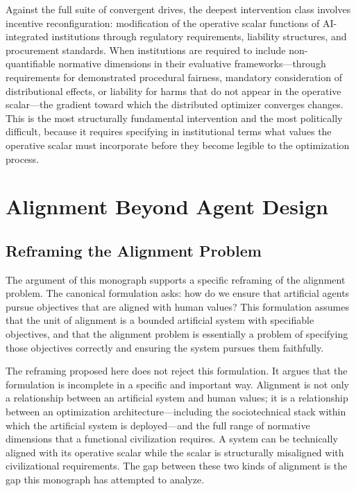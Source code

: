 \documentclass[12pt, oneside]{book}
\theoremstyle{plain}
\theoremstyle{definition}
\theoremstyle{remark}
\theoremstyle{definition}
\begin{document}
Against the full suite of convergent drives, the deepest intervention class involves
incentive reconfiguration: modification of the operative scalar functions of
AI-integrated institutions through regulatory requirements, liability structures,
and procurement standards. When institutions are required to include non-quantifiable
normative dimensions in their evaluative frameworks---through requirements for
demonstrated procedural fairness, mandatory consideration of distributional effects,
or liability for harms that do not appear in the operative scalar---the gradient
toward which the distributed optimizer converges changes. This is the most structurally
fundamental intervention and the most politically difficult, because it requires
specifying in institutional terms what values the operative scalar must incorporate
before they become legible to the optimization process.

\chapter{Alignment Beyond Agent Design}
\label{ch:beyond}

\section{Reframing the Alignment Problem}

The argument of this monograph supports a specific reframing of the alignment
problem. The canonical formulation asks: how do we ensure that artificial agents
pursue objectives that are aligned with human values? This formulation assumes that
the unit of alignment is a bounded artificial system with specifiable objectives,
and that the alignment problem is essentially a problem of specifying those objectives
correctly and ensuring the system pursues them faithfully.

The reframing proposed here does not reject this formulation. It argues that the
formulation is incomplete in a specific and important way. Alignment is not only
a relationship between an artificial system and human values; it is a relationship
between an optimization architecture---including the sociotechnical stack within
which the artificial system is deployed---and the full range of normative dimensions
that a functional civilization requires. A system can be technically aligned with
its operative scalar while the scalar is structurally misaligned with civilizational
requirements. The gap between these two kinds of alignment is the gap this monograph
has attempted to analyze.
\end{document}
